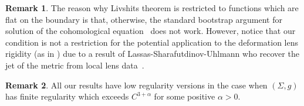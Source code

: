 \documentclass[JEP,XML,SOM,Unicode,NoFloatCountersInSection]{cedram}
\theoremstyle{definition}
\newtheorem*{remark*}{Remark}
\renewcommand{\>}{{\rangle}}
\newcommand{\<}{{\langle}}
\begin{document}
\begin{remark*}
The reason why Livshits theorem is restricted to functions which are flat on the boundary is that, otherwise, the standard bootstrap argument for solution of the cohomological equation~\cite{LMM86} does not work. However, notice that our condition is not a restriction for the potential application to the deformation lens rigidity (as in \cite{G17}) due to a result of Lassas-Sharafutdinov-Uhlmann who recover the jet of the metric from local lens data~\cite{LSU03}.
\end{remark*}

\begin{remark*} All our results have low regularity versions in the case when $(\Sigma, g)$ has finite regularity which exceeds $C^{3+\alpha}$ for some positive $\alpha>0$.
\end{remark*}
\end{document}
